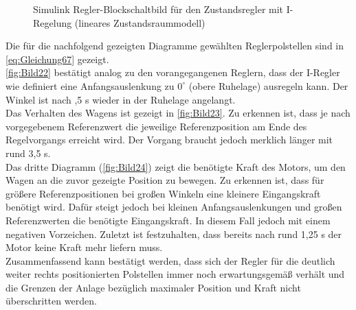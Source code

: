 \begin{figure}[H]
    \centering
    \caption[Regler mit I-Regelung Simulink (linear)]{Simulink Regler-Blockschaltbild für den Zustandsregler mit I-Regelung (lineares Zustandsraummodell)}
    \label{fig:Bild21}
\end{figure}

Die für die nachfolgend gezeigten Diagramme gewählten Reglerpolstellen sind in \autoref{eq:Gleichung67} gezeigt. \\
\newline
\autoref{fig:Bild22} bestätigt analog zu den vorangegangenen Reglern, dass der I-Regler wie definiert eine Anfangsauslenkung zu $0^\circ$ (obere Ruhelage) ausregeln kann. Der Winkel ist nach ,5 s wieder in der Ruhelage angelangt. \\
\newline
Das Verhalten des Wagens ist gezeigt in \autoref{fig:Bild23}. Zu erkennen ist, dass je nach vorgegebenem Referenzwert die jeweilige Referenzposition am Ende des Regelvorgangs erreicht wird. Der Vorgang braucht jedoch merklich länger mit rund 3,5 s. \\
\newline
Das dritte Diagramm (\autoref{fig:Bild24}) zeigt die benötigte Kraft des Motors, um den Wagen an die zuvor gezeigte Position zu bewegen. Zu erkennen ist, dass für größere Referenzpositionen bei großen Winkeln eine kleinere Eingangskraft benötigt wird. Dafür steigt jedoch bei kleinen Anfangsauslenkungen und großen Referenzwerten die benötigte Eingangskraft. In diesem Fall jedoch mit einem negativen Vorzeichen. Zuletzt ist festzuhalten, dass bereits nach rund 1,25 s der Motor keine Kraft mehr liefern muss.\\
\newline
Zusammenfassend kann bestätigt werden, dass sich der Regler für die deutlich weiter rechts positionierten Polstellen immer noch erwartungsgemäß verhält und die Grenzen der Anlage bezüglich maximaler Position und Kraft nicht überschritten werden.

